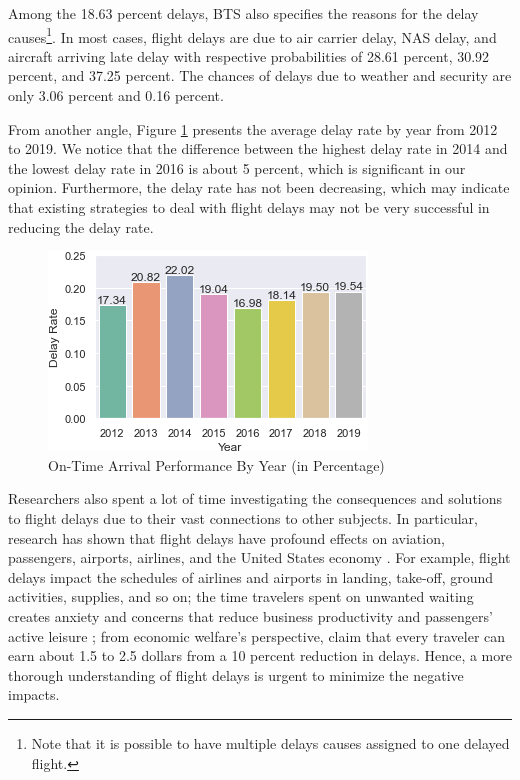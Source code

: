 \documentclass[11pt]{article}
\begin{document}
Among the 18.63 percent delays, BTS also specifies the reasons for the delay causes\footnote{Note that it is possible to have multiple delays causes assigned to one delayed flight.}. In most cases, flight delays are due to air carrier delay, NAS delay, and aircraft arriving late delay with respective probabilities of 28.61 percent, 30.92 percent, and 37.25 percent. The chances of delays due to weather and security are only 3.06 percent and 0.16 percent. 

From another angle, Figure \ref{fig:bar_plot1} presents the average delay rate by year from 2012 to 2019. We notice that the difference between the highest delay rate in 2014 and the lowest delay rate in 2016 is about 5 percent, which is significant in our opinion. Furthermore, the delay rate has not been decreasing, which may indicate that existing strategies to deal with flight delays may not be very successful in reducing the delay rate. 

\begin{figure}[h!]
\centering
\includegraphics[width = \columnwidth]{bar_plot1}
\caption{On-Time Arrival Performance By Year (in Percentage)}\label{fig:bar_plot1}
\end{figure}

Researchers also spent a lot of time investigating the consequences and solutions to flight delays due to their vast connections to other subjects. In particular, research has shown that flight delays have profound effects on aviation, passengers, airports, airlines, and the United States economy \citep{ar:carvalho_et_al, ar:peterson_neels_barczi_graham}. For example, flight delays impact the schedules of airlines and airports in landing, take-off, ground activities, supplies, and so on; the time travelers spent on unwanted waiting creates anxiety and concerns that reduce business productivity and passengers' active leisure \citep{ar:peterson_neels_barczi_graham}; from economic welfare's perspective, \citet{ar:britto_dresner_voltes} claim that every traveler can earn about 1.5 to 2.5 dollars from a 10 percent reduction in delays. Hence, a more thorough understanding of flight delays is urgent to minimize the negative impacts. 
\end{document}
